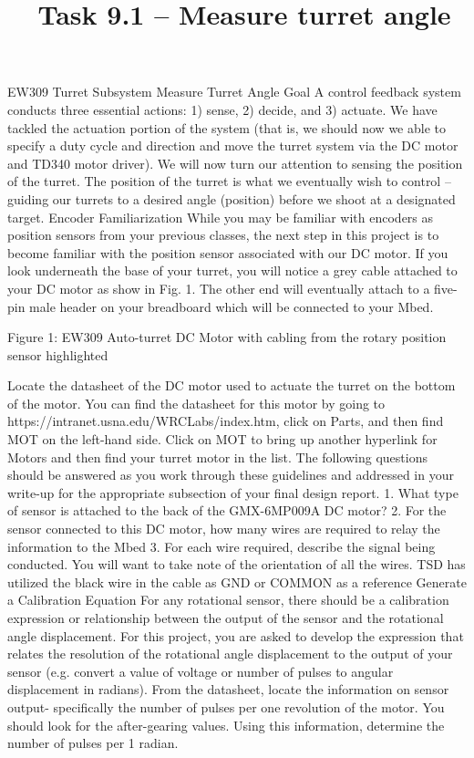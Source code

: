 \documentclass{tufte-handout}
\title{\usnaCourseNumber\ Task 9.1 -- Measure turret angle}
\author{\usnaInstructorShort}
\date{\printdate{\courseWeekSeven}}
\begin{document}
\maketitle

EW309 Turret Subsystem 
Measure Turret Angle
Goal
A control feedback system conducts three essential actions: 1) sense, 2) decide, and 3) actuate. We have tackled the actuation portion of the system (that is, we should now we able to specify a duty cycle and direction and move the turret system via the DC motor and TD340 motor driver).  
We will now turn our attention to sensing the position of the turret.  The position of the turret is what we eventually wish to control – guiding our turrets to a desired angle (position) before we shoot at a designated target.  
Encoder Familiarization
While you may be familiar with encoders as position sensors from your previous classes, the next step in this project is to become familiar with the position sensor associated with our DC motor.  If you look underneath the base of your turret, you will notice a grey cable attached to your DC motor as show in Fig. 1.  The other end will eventually attach to a five-pin male header on your breadboard which will be connected to your Mbed.
                                                                          
Figure 1: EW309 Auto-turret DC Motor with cabling from the rotary position sensor highlighted

Locate the datasheet of the DC motor used to actuate the turret on the bottom of the motor.  You can find the datasheet for this motor by going to https://intranet.usna.edu/WRCLabs/index.htm, click on Parts, and then find MOT on the left-hand side.  Click on MOT to bring up another hyperlink for Motors and then find your turret motor in the list.  
The following questions should be answered as you work through these guidelines and addressed in your write-up for the appropriate subsection of your final design report.
    1. What type of sensor is attached to the back of the GMX-6MP009A DC motor?
    2. For the sensor connected to this DC motor, how many wires are required to relay the information to the Mbed
    3. For each wire required, describe the signal being conducted.  You will want to take note of the orientation of all the wires.  TSD has utilized the black wire in the cable as GND or COMMON as a reference
Generate a Calibration Equation 
For any rotational sensor, there should be a calibration expression or relationship between the output of the sensor and the rotational angle displacement.  For this project, you are asked to develop the expression that relates the resolution of the rotational angle displacement to the output of your sensor (e.g. convert a value of voltage or number of pulses to angular displacement in radians).  
From the datasheet, locate the information on sensor output- specifically the number of pulses per one revolution of the motor.  You should look for the after-gearing values.  Using this information, determine the number of pulses per 1 radian.  
\end{document}
